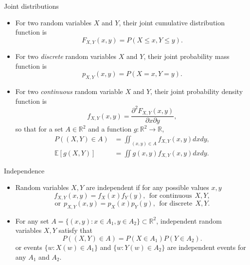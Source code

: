 \documentclass[10pt]{beamer}
\newcommand{\expect}{\mathbb{E}}
\begin{document}
\begin{frame}{Joint distributions}
    \begin{itemize}
        \item For two random variables $X$ and $Y$, their joint cumulative distribution function is 
        \[
            F_{X, Y}(x, y) = P(X \le x, Y \le y).
        \]
        \item For two \textit{discrete} random variables $X$ and $Y$, their joint probability mass function is 
        \[
            p_{X, Y}(x, y) = P(X = x, Y = y). 
        \]
        \item For two \textit{continuous} random variable $X$ and $Y$, their joint probability density function is 
        \[
            f_{X, Y}(x, y) = \frac{\partial^2 F_{X, Y}(x, y)}{\partial x \partial y}, 
        \]
        so that for a set $A \in \mathbb{R}^2$ and a function $g: \mathbb{R}^2 \to \mathbb{R}$,
        \begin{align*}
            P((X, Y) \in A) &= \iint_{(x, y) \in A}f_{X, Y}(x, y) dxdy, \\
            \expect[g(X, Y)] &= \iint g(x, y)f_{X, Y}(x, y)dxdy.
        \end{align*}
    \end{itemize}
\end{frame}

\begin{frame}{Independence}
    \begin{itemize}
        \item     Random variables $X, Y$ are independent if for any possible values $x, y$
    \[
        f_{X, Y}(x, y) = f_{X}(x)f_Y(y), ~~\text{for continuous}~~ X, Y, 
    \]
    \[
        \text{or}~~ p_{X, Y}(x, y) = p_X(x)p_Y(y), ~~\text{for discrete}~~ X, Y.
    \]
        \item For any set $A = \{(x, y): x \in A_1, y \in A_2\}  \subset \mathbb{R}^2$, independent random variables $X, Y$ satisfy that 
        \[
            P((X, Y) \in A) = P(X \in A_1)P(Y \in A_2). 
        \]
        or events $\{w: X(w) \in A_1\}$ and $\{w: Y(w) \in A_2\}$ are independent events for any $A_1$ and $A_2$. 
    \end{itemize}
\end{frame}
\end{document}
